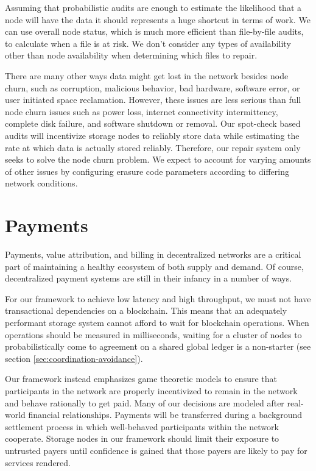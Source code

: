 \documentclass[8pt,fleqn,openany]{book}
\begin{document}
Assuming that probabilistic audits are enough to estimate the likelihood that
a node will have the data it should represents a huge shortcut in terms
of work. We can use overall node status,
which is much more efficient than file-by-file audits,
to calculate when a file is at risk.
We don't consider any types of availability other than node availability when
determining which files to repair.

There are many other ways data might get lost in the network besides node churn, such as corruption, malicious behavior, bad hardware, software error, or
user initiated space
reclamation. However, these issues are less serious than full node
churn issues such as power loss, internet connectivity intermittency, complete disk failure,
and software shutdown or removal.
Our spot-check based audits will incentivize storage nodes to reliably store
data
while estimating the rate at which data is actually stored reliably.
Therefore, our repair system only seeks to solve the node churn problem.
We expect to account for varying
amounts of other issues by configuring erasure code
parameters according to differing network conditions.

\section{Payments}

Payments, value attribution, and billing in decentralized networks are a critical part of maintaining a healthy
ecosystem of both supply and demand. Of course, decentralized payment systems
are still in their infancy in a number of ways.

For our framework to achieve low latency and high throughput, we must not have transactional dependencies on a blockchain. This means that an adequately performant storage system cannot afford to
wait for blockchain operations. When operations should be measured in
milliseconds, waiting for a cluster of nodes to probabilistically come to
agreement on a shared global ledger is a non-starter
(see section \ref{sec:coordination-avoidance}).

Our framework instead emphasizes game theoretic models to ensure
that participants in the network are properly incentivized to remain in the
network and behave rationally to get paid.
Many of our decisions are modeled after real-world financial relationships.
Payments will be transferred during
a background settlement process in which well-behaved participants within
the network cooperate. Storage nodes in our framework should limit their exposure
to untrusted payers until confidence is gained that those payers are likely
to pay for services rendered.
\end{document}
